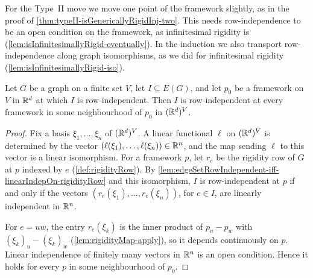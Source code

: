 For the Type~II move we move one point of the framework slightly, as
in the proof of \cref{thm:typeII-isGenericallyRigidInj-two}. This
needs row-independence to be an open condition on the framework, as
infinitesimal rigidity is (\cref{lem:isInfinitesimallyRigid-eventually}).
In the induction we also transport row-independence along graph
isomorphisms, as we did for infinitesimal rigidity
(\cref{lem:isInfinitesimallyRigid-iso}).

\begin{lemma}
  \label{lem:edgeSet-rowIndependent-eventually}
  \leanok
  Let $G$ be a graph on a finite set $V$, let $I \subseteq E(G)$, and
  let $p_0$ be a framework on $V$ in ${\mathbb{R}}^{d}$ at which $I$ is
  row-independent. Then $I$ is row-independent at every framework in
  some neighbourhood of $p_0$ in $({\mathbb{R}}^{d})^{V}$.
\end{lemma}
\begin{proof}
  \leanok
  Fix a basis $\xi_1, \dots, \xi_n$ of $({\mathbb{R}}^{d})^{V}$. A linear
  functional $\ell$ on $({\mathbb{R}}^{d})^{V}$ is determined by the vector
  $(\ell(\xi_1), \dots, \ell(\xi_n)) \in {\mathbb{R}}^{n}$, and the map sending
  $\ell$ to this vector is a linear isomorphism. For a framework $p$,
  let $r_e$ be the rigidity row of $G$ at $p$ indexed by $e$
  (\cref{def:rigidityRow}). By
  \cref{lem:edgeSetRowIndependent-iff-linearIndepOn-rigidityRow} and
  this isomorphism, $I$ is row-independent at $p$ if and only if the
  vectors $(r_e(\xi_1), \dots, r_e(\xi_n))$, for $e \in I$,
  are linearly independent in ${\mathbb{R}}^{n}$.

  For $e = uw$, the entry $r_e(\xi_k)$ is the inner product of
  $p_u - p_w$ with $(\xi_k)_u - (\xi_k)_w$
  (\cref{lem:rigidityMap-apply}), so it depends continuously on $p$.
  Linear independence of finitely many vectors in ${\mathbb{R}}^{n}$ is an open
  condition. Hence it holds for every $p$ in some neighbourhood of
  $p_0$.
\end{proof}

